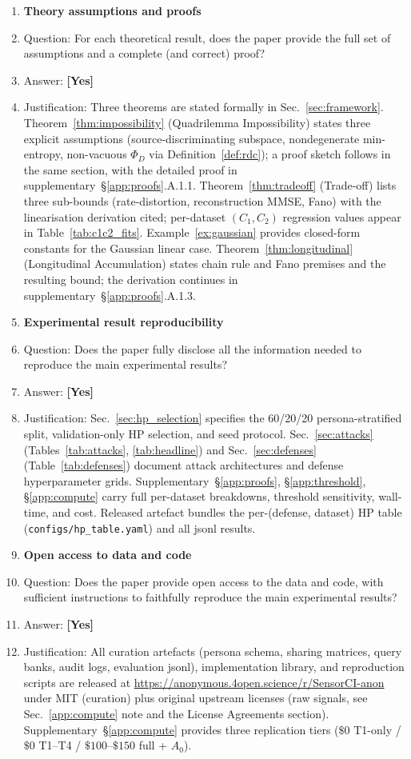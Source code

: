 \documentclass{article}
\theoremstyle{remark}
\begin{document}
\begin{enumerate}
\item {\bf Theory assumptions and proofs}
\item[] Question: For each theoretical result, does the paper provide the full set of assumptions and a complete (and correct) proof?
\item[] Answer: \textbf{[Yes]}
\item[] Justification: Three theorems are stated formally in Sec.~\ref{sec:framework}. Theorem~\ref{thm:impossibility} (Quadrilemma Impossibility) states three explicit assumptions (source-discriminating subspace, nondegenerate min-entropy, non-vacuous $\Phi_D$ via Definition~\ref{def:rdc}); a proof sketch follows in the same section, with the detailed proof in supplementary~\S\ref{app:proofs}.A.1.1. Theorem~\ref{thm:tradeoff} (Trade-off) lists three sub-bounds (rate-distortion, reconstruction MMSE, Fano) with the linearisation derivation cited; per-dataset $(C_1, C_2)$ regression values appear in Table~\ref{tab:c1c2_fits}. Example~\ref{ex:gaussian} provides closed-form constants for the Gaussian linear case. Theorem~\ref{thm:longitudinal} (Longitudinal Accumulation) states chain rule and Fano premises and the resulting bound; the derivation continues in supplementary~\S\ref{app:proofs}.A.1.3.

\item {\bf Experimental result reproducibility}
\item[] Question: Does the paper fully disclose all the information needed to reproduce the main experimental results?
\item[] Answer: \textbf{[Yes]}
\item[] Justification: Sec.~\ref{sec:hp_selection} specifies the 60/20/20 persona-stratified split, validation-only HP selection, and seed protocol. Sec.~\ref{sec:attacks} (Tables~\ref{tab:attacks}, \ref{tab:headline}) and Sec.~\ref{sec:defenses} (Table~\ref{tab:defenses}) document attack architectures and defense hyperparameter grids. Supplementary~\S\ref{app:proofs}, \S\ref{app:threshold}, \S\ref{app:compute} carry full per-dataset breakdowns, threshold sensitivity, wall-time, and cost. Released artefact bundles the per-(defense, dataset) HP table (\texttt{configs/hp\_table.yaml}) and all jsonl results.

\item {\bf Open access to data and code}
\item[] Question: Does the paper provide open access to the data and code, with sufficient instructions to faithfully reproduce the main experimental results?
\item[] Answer: \textbf{[Yes]}
\item[] Justification: All curation artefacts (persona schema, sharing matrices, query banks, audit logs, evaluation jsonl), implementation library, and reproduction scripts are released at \url{https://anonymous.4open.science/r/SensorCI-anon} under MIT (curation) plus original upstream licenses (raw signals, see Sec.~\ref{app:compute} note and the License Agreements section). Supplementary~\S\ref{app:compute} provides three replication tiers ($\$0$ T1-only / $\$0$ T1--T4 / $\$100$--$\$150$ full + $A_0$).


\end{enumerate}
\end{document}

